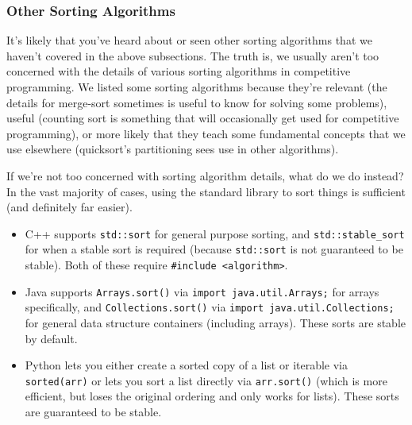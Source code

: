 \subsubsection{Other Sorting Algorithms}

It's likely that you've heard about or seen other sorting algorithms that we haven't covered in the above subsections. The truth is, we usually aren't too concerned with the details of various sorting algorithms in competitive programming. We listed some sorting algorithms because they're relevant (the details for merge-sort sometimes is useful to know for solving some problems), useful (counting sort is something that will occasionally get used for competitive programming), or more likely that they teach some fundamental concepts that we use elsewhere (quicksort's partitioning sees use in other algorithms).

If we're not too concerned with sorting algorithm details, what do we do instead? In the vast majority of cases, using the standard library to sort things is sufficient (and definitely far easier).
\begin{itemize}
\item C++ supports \texttt{std::sort} for general purpose sorting, and \texttt{std::stable_sort} for when a stable sort is required (because \texttt{std::sort} is not guaranteed to be stable). Both of these require \texttt{#include <algorithm>}.
\item Java supports \texttt{Arrays.sort()} via \texttt{import java.util.Arrays;} for arrays specifically, and \texttt{Collections.sort()} via \texttt{import java.util.Collections;} for general data structure containers (including arrays). These sorts are stable by default.
\item Python lets you either create a sorted copy of a list or iterable via \texttt{sorted(arr)} or lets you sort a list directly via \texttt{arr.sort()} (which is more efficient, but loses the original ordering and only works for lists). These sorts are guaranteed to be stable.
\end{itemize}

